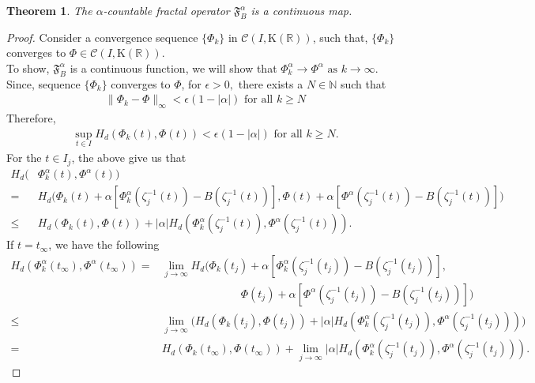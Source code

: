 \documentclass[12pt,oneside,reqno]{amsart}
\newtheorem{theorem}{Theorem}[section]
\theoremstyle{definition}
\theoremstyle{remark}
\begin{document}
  
\begin{theorem}\label{fractoperator}
The $\alpha$-countable fractal operator $\mathfrak{F}^{\alpha}_B$ is a continuous map.
\end{theorem}
\begin{proof}
Consider a convergence sequence $\{\Phi_k\}$ in $\mathcal{C}(I,\mathrm{K}(\mathbb{R}))$, such that, $\{\Phi_k\}$ converges to $\Phi\in \mathcal{C}(I,\mathrm{K}(\mathbb{R})).$  \\To show, $\mathfrak{F}^{\alpha}_B $ is a continuous function, we will show that $\Phi_k^{\alpha}\to \Phi^{\alpha} \text{ as }k\rightarrow\infty.$\\ Since, sequence $\{\Phi_k\}$ converges to $\Phi$, for $\epsilon>0,$ there exists a $N\in \mathbb{N}$ such that
\begin{align*}
    \lVert \Phi_k-\Phi\rVert_{\infty}< \epsilon(1-\lvert\alpha \rvert ) \text{  for all } k \geq N
\end{align*}
Therefore,
\begin{align*}
    \underset{t\in I}{\sup}H_d(\Phi_k(t), \Phi(t)) < \epsilon(1-\lvert\alpha\rvert ) \text{ for all } k \geq N.
    \end{align*}
  For the $t\in I_j$, the above give us that
    \begin{align*}
        H_d(&\Phi_k^{\alpha}(t), \Phi^{\alpha}(t))\\ =&H_{d}\bigg(\Phi_{k}(t)+\alpha\left[\Phi^{\alpha}_{k}(\zeta^{-1}_{j}(t))-B(\zeta^{-1}_{j}(t))\right], \Phi(t)+\alpha\left[\Phi^{\alpha}(\zeta^{-1}_{j}(t))-B(\zeta^{-1}_{j}(t))\right]\bigg)\\
\leq & H_{d}(\Phi_{k}(t),\Phi(t))+\lvert \alpha \rvert H_d(\Phi^{\alpha}_{k}(\zeta^{-1}_{j}(t)),\Phi^{\alpha}(\zeta^{-1}_{j}(t))).
   \end{align*}
   If $t=t_\infty $, we have the following
    \begin{align*}
         H_d(\Phi_k^{\alpha}(t_\infty), \Phi^{\alpha}(t_\infty)) =& \underset{j\rightarrow \infty}{\lim}H_{d}\bigg(\Phi_{k}(t_j)+\alpha\left[\Phi^{\alpha}_{k}(\zeta^{-1}_{j}(t_j))-B(\zeta^{-1}_{j}(t_j))\right], \\&\hspace{3cm}\Phi(t_j)+\alpha\left[\Phi^{\alpha}(\zeta^{-1}_{j}(t_j))-B(\zeta^{-1}_{j}(t_j))\right]\bigg)\\
\leq & \underset{j\rightarrow \infty}{\lim}\Big( H_{d}(\Phi_{k}(t_j),\Phi(t_j))+\lvert \alpha \rvert H_d(\Phi^{\alpha}_{k}(\zeta^{-1}_{j}(t_j)),\Phi^{\alpha}(\zeta^{-1}_{j}(t_j)))\Big)\\ =&  H_{d}(\Phi_{k}(t_\infty),\Phi(t_\infty))+\underset{j\rightarrow \infty}{\lim}\lvert \alpha \rvert H_d(\Phi^{\alpha}_{k}(\zeta^{-1}_{j}(t_j)),\Phi^{\alpha}(\zeta^{-1}_{j}(t_j))).

\end{align*}
\end{proof}
\end{document}

